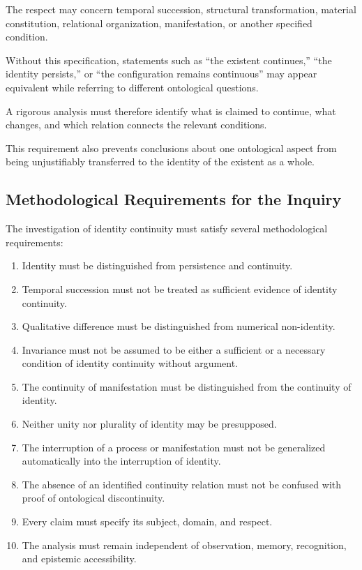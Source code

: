 The respect may concern temporal succession,
structural transformation, material
constitution, relational organization,
manifestation, or another specified
condition.

Without this specification, statements
such as ``the existent continues,''
``the identity persists,'' or
``the configuration remains continuous''
may appear equivalent while referring
to different ontological questions.

A rigorous analysis must therefore
identify what is claimed to continue,
what changes, and which relation
connects the relevant conditions.

This requirement also prevents conclusions
about one ontological aspect from being
unjustifiably transferred to the identity
of the existent as a whole.

\subsection{Methodological Requirements for the Inquiry}

The investigation of identity continuity
must satisfy several methodological
requirements:

\begin{enumerate}
    \item Identity must be distinguished
    from persistence and continuity.

    \item Temporal succession must not
    be treated as sufficient evidence
    of identity continuity.

    \item Qualitative difference must
    be distinguished from numerical
    non-identity.

    \item Invariance must not be assumed
    to be either a sufficient or a
    necessary condition of identity
    continuity without argument.

    \item The continuity of manifestation
    must be distinguished from the
    continuity of identity.

    \item Neither unity nor plurality
    of identity may be presupposed.

    \item The interruption of a process
    or manifestation must not be
    generalized automatically into
    the interruption of identity.

    \item The absence of an identified
    continuity relation must not be
    confused with proof of ontological
    discontinuity.

    \item Every claim must specify
    its subject, domain, and respect.

    \item The analysis must remain
    independent of observation,
    memory, recognition, and
    epistemic accessibility.
\end{enumerate}

